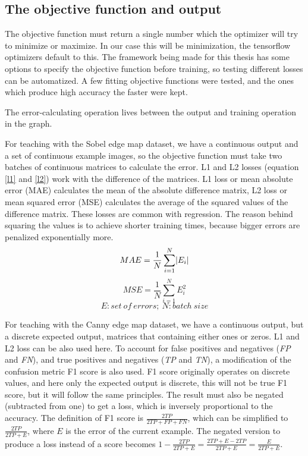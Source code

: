 \documentclass[12pt]{report}
\begin{document}
\subsection{The objective function and output}
The objective function must return a single number which the optimizer will try to minimize or maximize. In our case this will be minimization, the tensorflow optimizers default to this. The framework being made for this thesis has some options to specify the objective function before training, so testing different losses can be automatized. A few fitting objective functions were tested, and the ones which produce high accuracy the faster were kept.

The error-calculating operation lives between the output and training operation in the graph.

For teaching with the Sobel edge map dataset, we have a continuous output and a set of continuous example images, so the objective function must take two batches of continuous matrices to calculate the error. L1 and L2 losses (equation \ref{l1} and \ref{l2}) work with the difference of the matrices. L1 loss or mean absolute error (MAE) calculates the mean of the absolute difference matrix, L2 loss or mean squared error (MSE) calculates the average of the squared values of the difference matrix. These losses are common with regression. The reason behind squaring the values is to achieve shorter training times, because bigger errors are penalized exponentially more.
\begin{equation} \label{l1}
MAE = \frac{1}{N}\sum_{i=1}^{N}\abs{E_{i}}
\end{equation}
\begin{equation} \label{l2}
MSE = \frac{1}{N}\sum_{i=1}^{N}E_{i}^{2}
\end{equation}
\begin{equation*}
E:set\ of\ errors;\ N:batch\ size
\end{equation*}

For teaching with the Canny edge map dataset, we have a continuous output, but a discrete expected output, matrices that containing either ones or zeros. L1 and L2 loss can be also used here. To account for false positives and negatives (\textit{FP} and \textit{FN}), and true positives and negatives (\textit{TP} and \textit{TN}), a modification of the confusion metric F1 score is also used. F1 score originally operates on discrete values, and here only the expected output is discrete, this will not be true F1 score, but it will follow the same principles. The result must also be negated (subtracted from one) to get a loss, which is inversely proportional to the accuracy. The definition of F1 score is $ \frac{2TP}{2TP + FP + FN} $, which can be simplified to $ \frac{2TP}{2TP + E} $, where $ E $ is the error of the current example. The negated version to produce a loss instead of a score becomes $ 1 - \frac{2TP}{2TP + E} = \frac{2TP + E - 2TP}{2TP + E} = \frac{E}{2TP + E} $.
\end{document}

